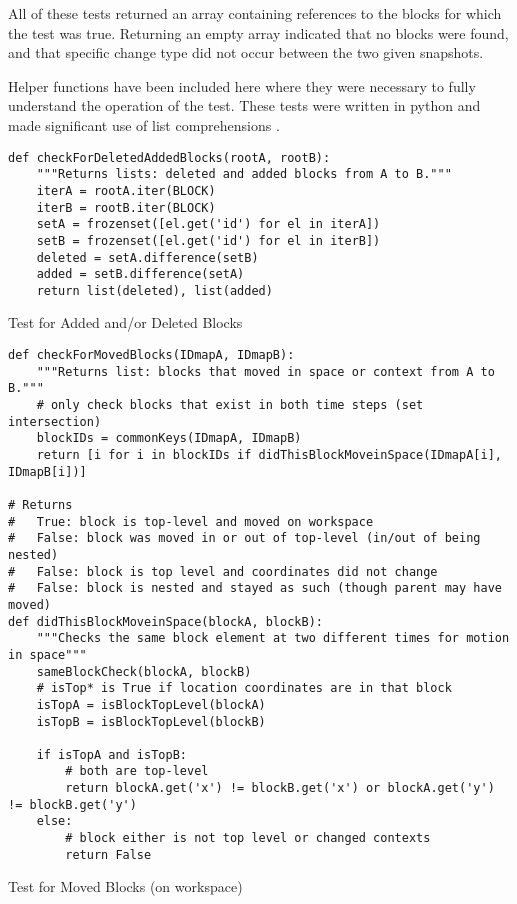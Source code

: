 All of these tests returned an array containing references to the blocks for which the test was true. Returning an empty array indicated that no blocks were found, and that specific change type did not occur between the two given snapshots.

Helper functions have been included here where they were necessary to fully understand the operation of the test. These tests were written in python and made significant use of list comprehensions \citep{oliphant2007python}.

\begin{listing}[]
\begin{verbatim}
def checkForDeletedAddedBlocks(rootA, rootB):
    """Returns lists: deleted and added blocks from A to B."""
    iterA = rootA.iter(BLOCK)
    iterB = rootB.iter(BLOCK)
    setA = frozenset([el.get('id') for el in iterA])
    setB = frozenset([el.get('id') for el in iterB])
    deleted = setA.difference(setB)
    added = setB.difference(setA)
    return list(deleted), list(added)
\end{verbatim}
\caption{Test for Added and/or Deleted Blocks}
\label{src:lst:add-delete}
\end{listing}

\begin{listing}[]
\begin{verbatim}
def checkForMovedBlocks(IDmapA, IDmapB):
    """Returns list: blocks that moved in space or context from A to B."""
    # only check blocks that exist in both time steps (set intersection)
    blockIDs = commonKeys(IDmapA, IDmapB)
    return [i for i in blockIDs if didThisBlockMoveinSpace(IDmapA[i], IDmapB[i])]

# Returns
#   True: block is top-level and moved on workspace
#   False: block was moved in or out of top-level (in/out of being nested)
#   False: block is top level and coordinates did not change
#   False: block is nested and stayed as such (though parent may have moved)
def didThisBlockMoveinSpace(blockA, blockB):
    """Checks the same block element at two different times for motion in space"""
    sameBlockCheck(blockA, blockB)
    # isTop* is True if location coordinates are in that block
    isTopA = isBlockTopLevel(blockA)
    isTopB = isBlockTopLevel(blockB)

    if isTopA and isTopB:
        # both are top-level
        return blockA.get('x') != blockB.get('x') or blockA.get('y') != blockB.get('y')
    else:
        # block either is not top level or changed contexts
        return False
\end{verbatim}
\caption{Test for Moved Blocks (on workspace)}
\end{listing}

